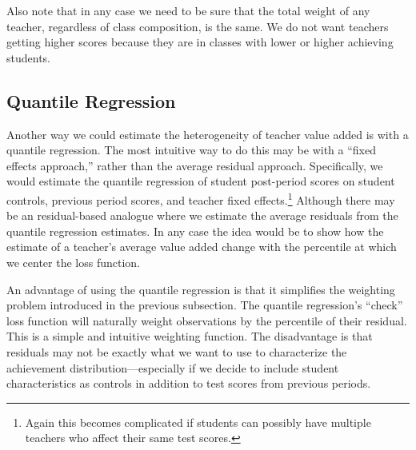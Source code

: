 \documentclass[letterpaper,12pt]{article}
\begin{document}
Also note that in any case we need to be sure that the total weight of any teacher, regardless of class composition, is the same. We do not want teachers getting higher scores because they are in classes with lower or higher achieving students.

\subsection{Quantile Regression}
Another way we could estimate the heterogeneity of teacher value added is with a quantile regression. The most intuitive way to do this may be with a ``fixed effects approach,'' rather than the average residual approach. Specifically, we would estimate the quantile regression of student post-period scores on student controls, previous period scores, and teacher fixed effects.\footnote{Again this becomes complicated if students can possibly have multiple teachers who affect their same test scores.} Although there may be an residual-based analogue where we estimate the average residuals from the quantile regression estimates. In any case the idea would be to show how the estimate of a teacher's average value added change with the percentile at which we center the loss function. 

An advantage of using the quantile regression is that it simplifies the weighting problem introduced in the previous subsection. The quantile regression's ``check'' loss function will naturally weight observations by the percentile of their residual. This is a simple and intuitive weighting function. The disadvantage is that residuals may not be exactly what we want to use to characterize the achievement distribution---especially if we decide to include student characteristics as controls in addition to test scores from previous periods.
\end{document}

